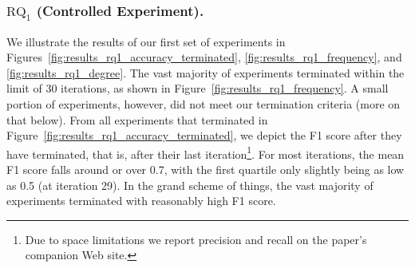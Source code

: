 \documentclass[sigconf]{acmart}
\begin{document}
	\subsubsection{$\text{RQ}_1$ (Controlled Experiment).}
	We illustrate the results of our first set of experiments in Figures~\ref{fig:results_rq1_accuracy_terminated}, \ref{fig:results_rq1_frequency}, and \ref{fig:results_rq1_degree}. The vast majority of experiments terminated within the limit of 30 iterations, as shown in Figure~\ref{fig:results_rq1_frequency}. A small portion of experiments, however, did not meet our termination criteria (more on that below). From all experiments that terminated in Figure~\ref{fig:results_rq1_accuracy_terminated}, we depict the F1 score after they have terminated, that is, after their last iteration\footnote{Due to space limitations we report precision and recall on the paper's companion Web site.}. For most iterations, the mean F1 score falls around or over 0.7, with the first quartile  only slightly being as low as 0.5 (at iteration 29).  In the grand scheme of things, the vast majority of experiments terminated with reasonably high F1 score. 
\end{document}
